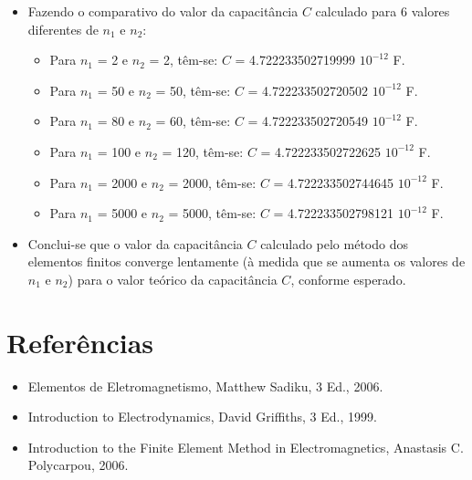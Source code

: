 \documentclass[10pt]{article}
\begin{document}
\begin{itemize}
    \item Fazendo o comparativo do valor da capacitância $C$ calculado para 6 valores diferentes de $n_{1}$ e $n_{2}$:
    \begin{itemize}
        \item Para $n_{1}$ = 2 e $n_{2}$ = 2, têm-se: $C$ = 4.722233502719999 \cdot $10^{-12}$ F.
        \item Para $n_{1}$ = 50 e $n_{2}$ = 50, têm-se: $C$ = 4.722233502720502 \cdot $10^{-12}$ F.
        \item Para $n_{1}$ = 80 e $n_{2}$ = 60, têm-se: $C$ = 4.722233502720549 \cdot $10^{-12}$ F.
        \item Para $n_{1}$ = 100 e $n_{2}$ = 120, têm-se: $C$ = 4.722233502722625 \cdot $10^{-12}$ F.
        \item Para $n_{1}$ = 2000 e $n_{2}$ = 2000, têm-se: $C$ = 4.722233502744645 \cdot $10^{-12}$ F.
        \item Para $n_{1}$ = 5000 e $n_{2}$ = 5000, têm-se: $C$ = 4.722233502798121 \cdot $10^{-12}$ F.
    \end{itemize}
    \item Conclui-se que o valor da capacitância $C$ calculado pelo método dos elementos finitos converge lentamente (à medida que se aumenta os valores de $n_{1}$ e $n_{2}$) para o valor teórico da capacitância $C$, conforme esperado.
    
    
    \end{itemize}

\section{Referências}
    \begin{itemize}
    \item Elementos de Eletromagnetismo, Matthew Sadiku, 3 Ed., 2006.
    \item Introduction to Electrodynamics, David Griffiths, 3 Ed., 1999.
    \item Introduction to the Finite Element Method in Electromagnetics, Anastasis C. Polycarpou, 2006.
    \end{itemize}
    
\end{document}
